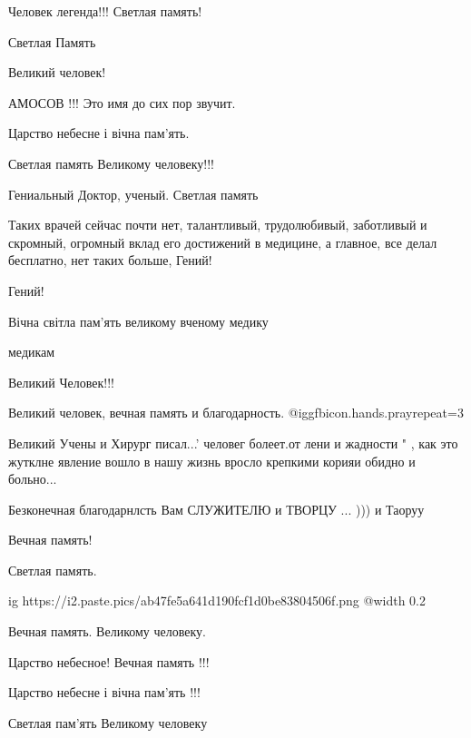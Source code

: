 \begin{itemize}
Человек легенда!!! Светлая память!


Светлая Память

Великий человек!

АМОСОВ !!! Это имя до сих пор звучит.

Царство небесне і вічна пам'ять.

Светлая память Великому человеку!!!

Гениальный Доктор, ученый. Светлая память


Таких врачей сейчас почти нет, талантливый, трудолюбивый, заботливый и
скромный, огромный вклад его достижений в медицине, а главное, все делал
бесплатно, нет таких больше, Гений!


Гений!

Вічна світла пам'ять великому вченому медику

медикам

Великий Человек!!!

Великий человек, вечная память и благодарность. @igg{fbicon.hands.pray}{repeat=3} 


Великий Учены и Хирург писал...' человег болеет.от лени и жадности " , как это
жутклне явление вошло в нашу жизнь вросло крепкими корияи
обидно и больно...

Безконечная благодарнлсть Вам СЛУЖИТЕЛЮ и ТВОРЦУ ... )))
и Таоруу

Вечная память!


Светлая память.

\ifcmt
  ig https://i2.paste.pics/ab47fe5a641d190fcf1d0be83804506f.png
  @width 0.2
\fi


Вечная память. Великому человеку.

Царство небесное! Вечная память !!!

Царство небесне і вічна пам'ять !!!

Светлая пам'ять Великому человеку



\end{itemize}
